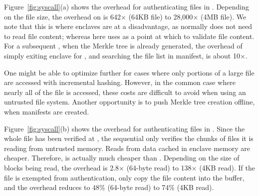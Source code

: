 Figure~\ref{fig:syscall}(a)
shows the overhead for authenticating files in .
Depending on the file size, the overhead on  is 642$\times$ (64KB file) to 28,000$\times$ (4MB file).
We note that this is where enclaves are at a disadvantage, as  
normally does not need to read file content; whereas here \graphenesgx{} uses 
as a point at which to validate file content.
For a subsequent , when the Merkle tree is already generated, the overhead of simply exiting enclave for , and searching the file list in manifest, is about 10$\times$.


One might be able to optimize further for cases where only portions of a large file are accessed
with incremental hashing.  However, in the common case where nearly all of the file is accessed,
these costs are difficult to avoid when using an untrusted file system.
Another opportunity 
is to push Merkle tree creation offline, when manifests are created.



Figure~\ref{fig:syscall}(b)
shows the overhead for authenticating files in .
Since the whole file has been verified at , the sequential  only verifies the chunks of files it is reading from untrusted memory.
Reads from data cached in enclave memory are cheaper.
 Therefore,  is actually much cheaper than .
Depending on the size of blocks being read, the overhead is 2.8$\times$ (64-byte read) to 138$\times$ (4KB read).
If the file is exempted from authentication,
\graphenesgx{} only copy the file content into the buffer, and the overhead reduces to 48\% (64-byte read) to 74\% (4KB read).



